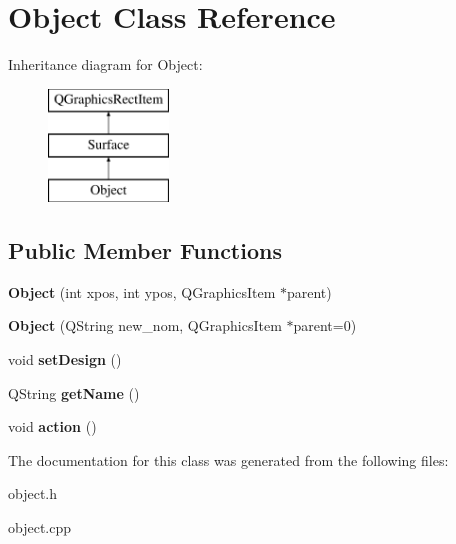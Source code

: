 \hypertarget{class_object}{}\section{Object Class Reference}
\label{class_object}
Inheritance diagram for Object\+:\begin{figure}[H]
\begin{center}
\leavevmode
\includegraphics[height=3.000000cm]{class_object}
\end{center}
\end{figure}
\subsection*{Public Member Functions}
\begin{DoxyCompactItemize}
\item 
\hypertarget{class_object_a61b5e9862ead7000e3125be5d81263a2}{}{\bfseries Object} (int xpos, int ypos, Q\+Graphics\+Item $\ast$parent)\label{class_object_a61b5e9862ead7000e3125be5d81263a2}

\item 
\hypertarget{class_object_a92bae89e044afc5957483772f557c5d7}{}{\bfseries Object} (Q\+String new\+\_\+nom, Q\+Graphics\+Item $\ast$parent=0)\label{class_object_a92bae89e044afc5957483772f557c5d7}

\item 
\hypertarget{class_object_a64d92ae18b1e70a8435690fe6fccf1fd}{}void {\bfseries set\+Design} ()\label{class_object_a64d92ae18b1e70a8435690fe6fccf1fd}

\item 
\hypertarget{class_object_a13fe059222e66ea54aa3f6f8615a3d72}{}Q\+String {\bfseries get\+Name} ()\label{class_object_a13fe059222e66ea54aa3f6f8615a3d72}

\item 
\hypertarget{class_object_a7007c7349c695b9ca7ad463d54081c25}{}void {\bfseries action} ()\label{class_object_a7007c7349c695b9ca7ad463d54081c25}

\end{DoxyCompactItemize}


The documentation for this class was generated from the following files\+:\begin{DoxyCompactItemize}
\item 
object.\+h\item 
object.\+cpp\end{DoxyCompactItemize}
